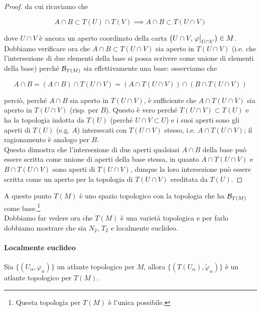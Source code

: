 \begin{proof}
	da cui ricaviamo che
	
	\begin{equation}
		A \cap B \subset T(U) \cap T(V) %
		\implies %
		A \cap B \subset T(U \cap V)
	\end{equation}

	dove $ U \cap V $ è ancora un aperto coordinato della carta $ \left( U \cap V,\eval{\varphi}_{U \cap V} \right) \in M $. Dobbiamo verificare ora che $ A \cap B \subset T(U \cap V) $ sia aperto in $ T(U \cap V) $ (i.e. che l'intersezione di due elementi della base si possa scrivere come unione di elementi della base) perché $ \mathcal{B}_{T(M)} $ sia effettivamente una base: osserviamo che
	
	\begin{equation}
		A \cap B = (A \cap B) \cap T(U \cap V) %
		= (A \cap T(U \cap V)) \cap (B \cap T(U \cap V))
	\end{equation}

	perciò, perché $ A \cap B $ sia aperto in $ T(U \cap V) $, è sufficiente che $ A \cap T(U \cap V) $ sia aperto in $ T(U \cap V) $ (risp. per $ B $). Questo è vero perché $ T(U \cap V) \subset T(U) $ e ha la topologia indotta da $ T(U) $ (perché $ U \cap V \subset U $) e i suoi aperti sono gli aperti di $ T(U) $ (e.g. $ A $) intersecati con $ T(U \cap V) $ stesso, i.e. $ A \cap T(U \cap V) $; il ragionamento è analogo per $ B $. \\
	Questo dimostra che l'intersezione di due aperti qualsiasi $ A \cap B $ della base può essere scritta come unione di aperti della base stessa, in quanto $ A \cap T(U \cap V) $ e $ B \cap T(U \cap V) $ sono aperti di $ T(U \cap V) $, dunque la loro intersezione può essere scritta come un aperto per la topologia di $ T(U \cap V) $ ereditata da $ T(U) $.
\end{proof}

A questo punto $ T(M) $ è uno spazio topologico con la topologia che ha $ \mathcal{B}_{T(M)} $ come base.\footnote{%
	Questa topologia per $ T(M) $ è l'unica possibile.%
} \\
Dobbiamo far vedere ora che $ T(M) $ è una varietà topologica e per farlo dobbiamo mostrare che sia $ N_{2} $, $ T_{2} $ e localmente euclideo.

\paragraph{Localmente euclideo}

\begin{definition}
	Sia $ \{(U_{\alpha},\varphi_{\alpha})\} $ un atlante topologico per $ M $, allora $ \{(T(U_{\alpha}),\tilde{\varphi}_{\alpha})\} $ è un atlante topologico per $ T(M) $.
\end{definition}

